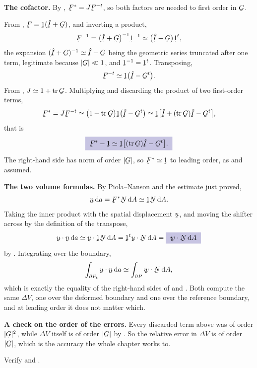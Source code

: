 \begin{solution}
\textbf{The cofactor.} By , $\bF^{*}=J\bF^{-t}$, so both
factors are needed to first order in $\bG$.

From , $\bF=\shift(\hI+\bG)$, and inverting a product,
\[
   \bF^{-1}=\big(\hI+\bG\big)^{-1}\shift^{-1}
   \simeq\big(\hI-\bG\big)\shift^{t},
\]
the expansion $(\hI+\bG)^{-1}\simeq\hI-\bG$ being the geometric series
truncated after one term, legitimate because $|\bG|\ll1$, and
$\shift^{-1}=\shift^{t}$. Transposing,
\[
   \bF^{-t}\simeq\shift\big(\hI-\bG^{t}\big).
\]
From , $J\simeq1+\tr\bG$. Multiplying and discarding the
product of two first-order terms,
\[
   \bF^{*}=J\bF^{-t}\simeq\big(1+\tr\bG\big)\shift
   \big(\hI-\bG^{t}\big)
   \simeq\shift\big[\hI+(\tr\bG)\hI-\bG^{t}\big],
\]
that is
\[
   \boxed{\;\bF^{*}-\shift\simeq\shift
   \big[(\tr\bG)\hI-\bG^{t}\big] .\;}
\]
The right-hand side has norm of order $|\bG|$, so $\bF^{*}\simeq\shift$
to leading order, as  and  assumed.

\textbf{The two volume formulas.} By Piola--Nanson  and the
estimate just proved,
\[
   \bn\,\dl a=\bF^{*}\bN\,\dl A\simeq\shift\bN\,\dl A .
\]
Taking the inner product with the spatial displacement $\bu$, and moving
the shifter across by the definition of the transpose,
\[
   \ip\bu\bn\,\dl a\simeq\ip\bu{\shift\bN}\,\dl A
   =\ip{\shift^{t}\bu}\bN\,\dl A
   =\boxed{\;\ip\bw\bN\,\dl A\;}
\]
by . Integrating over the boundary,
\[
   \int_{\partial P_{t}}\ip\bu\bn\,\dl a
   \simeq\int_{\partial P}\ip\bw\bN\,\dl A ,
\]
which is exactly the equality of the right-hand sides of  and
. Both compute the same $\Delta V$, one over the deformed
boundary and one over the reference boundary, and at leading order it
does not matter which.

\textbf{A check on the order of the errors.} Every discarded term above
was of order $|\bG|^{2}$, while $\Delta V$ itself is of order $|\bG|$
by . So the relative error in $\Delta V$ is of order
$|\bG|$, which is the accuracy the whole chapter works to.
\end{solution}

\begin{problem}
Verify  and .
\end{problem}

